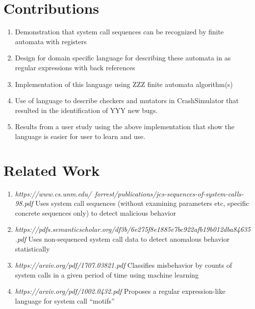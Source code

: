 \documentclass{article}
\begin{document}
\section{Contributions}
\begin{enumerate}
\item{Demonstration that system call sequences can be recognized by finite
    automata with registers}
\item{Design for domain specific language for describing these automata in
    as regular expressions with back references}
\item{Implementation of this language using ZZZ finite automata
    algorithm(s)}
\item{Use of language to describe checkers and mutators in CrashSimulator
    that resulted in the identification of YYY new bugs.}
\item{Results from a user study using the above implementation that show the
language is easier for user to learn and use.}
\end{enumerate}

\section{Related Work}

\begin{enumerate}
    \item{\textit{https://www.cs.unm.edu/~forrest/publications/jcs-sequences-of-system-calls-98.pdf}\break
        Uses system call sequences (without examining parameters etc, specific concrete
        sequences only) to detect malicious behavior}
    \item{\textit{https://pdfs.semanticscholar.org/df3b/6e275f8e1885e7bc922afb19b012dba84635.pdf}\break
Uses non-sequenced system call data to detect anomalous behavior
        statistically}
    \item{\textit{https://arxiv.org/pdf/1707.03821.pdf}\break
Classifies misbehavior by counts of system calls in a given period of time using
        machine learning}
    \item{\textit{https://arxiv.org/pdf/1002.0432.pdf}\break
        Proposes a regular expression-like language for system call “motifs”}
\end{enumerate}
\end{document}
